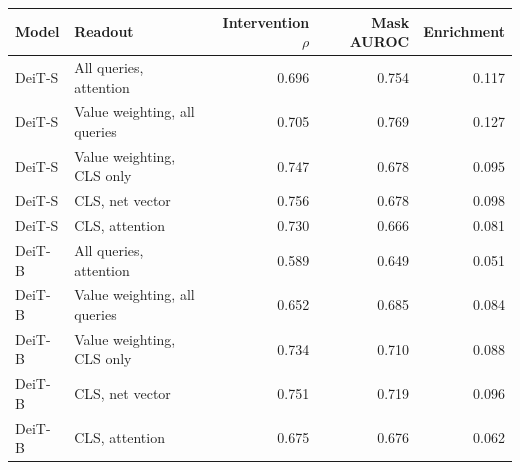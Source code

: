 \begin{tabular}{@{}llrrr@{}}
\toprule
Model & Readout & Intervention $\rho$ & Mask AUROC & Enrichment \\
\midrule
DeiT-S & All queries, attention & 0.696 & 0.754 & 0.117 \\
DeiT-S & Value weighting, all queries & 0.705 & 0.769 & 0.127 \\
DeiT-S & Value weighting, CLS only & 0.747 & 0.678 & 0.095 \\
DeiT-S & CLS, net vector & 0.756 & 0.678 & 0.098 \\
DeiT-S & CLS, attention & 0.730 & 0.666 & 0.081 \\
DeiT-B & All queries, attention & 0.589 & 0.649 & 0.051 \\
DeiT-B & Value weighting, all queries & 0.652 & 0.685 & 0.084 \\
DeiT-B & Value weighting, CLS only & 0.734 & 0.710 & 0.088 \\
DeiT-B & CLS, net vector & 0.751 & 0.719 & 0.096 \\
DeiT-B & CLS, attention & 0.675 & 0.676 & 0.062 \\
\bottomrule
\end{tabular}

